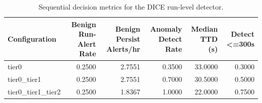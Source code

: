 \begin{table}[t]
\centering
\caption{Sequential decision metrics for the DICE run-level detector.}
\label{tab:dice_sequential_metrics}
\footnotesize
\begin{tabular}{lrrrrr}
\toprule
Configuration & Benign Run-Alert Rate & Benign Persist Alerts/hr & Anomaly Detect Rate & Median TTD (s) & Detect <=300s \\
\midrule
tier0 & 0.2500 & 2.7551 & 0.3500 & 33.0000 & 0.3000 \\
tier0_tier1 & 0.2500 & 2.7551 & 0.7000 & 30.5000 & 0.5000 \\
tier0_tier1_tier2 & 0.2500 & 1.8367 & 1.0000 & 22.0000 & 0.7500 \\
\bottomrule
\end{tabular}

\end{table}
